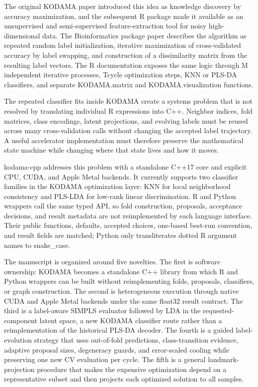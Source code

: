 \documentclass[twoside,11pt]{article}
\begin{document}
The original KODAMA paper introduced this idea as knowledge discovery by accuracy maximization, and the subsequent R package made it available as an unsupervised and semi-supervised feature-extraction tool for noisy high-dimensional data. The Bioinformatics package paper describes the algorithm as repeated random label initialization, iterative maximization of cross-validated accuracy by label swapping, and construction of a dissimilarity matrix from the resulting label vectors. The R documentation exposes the same logic through M independent iterative processes, Tcycle optimization steps, KNN or PLS-DA classifiers, and separate KODAMA.matrix and KODAMA.visualization functions.

The repeated classifier fits inside KODAMA create a systems problem that is not resolved by translating individual R expressions into C++. Neighbor indices, fold matrices, class encodings, latent projections, and evolving labels must be reused across many cross-validation calls without changing the accepted label trajectory. A useful accelerator implementation must therefore preserve the mathematical state machine while changing where that state lives and how it moves.

kodama-cpp addresses this problem with a standalone C++17 core and explicit CPU, CUDA, and Apple Metal backends. It currently supports two classifier families in the KODAMA optimization layer: KNN for local neighborhood consistency and PLS-LDA for low-rank linear discrimination. R and Python wrappers call the same typed API, so fold construction, proposals, acceptance decisions, and result metadata are not reimplemented by each language interface. Their public functions, defaults, accepted choices, one-based best-run convention, and result fields are matched; Python only transliterates dotted R argument names to snake\_case.

The manuscript is organized around five novelties. The first is software ownership: KODAMA becomes a standalone C++ library from which R and Python wrappers can be built without reimplementing folds, proposals, classifiers, or graph construction. The second is heterogeneous execution through native CUDA and Apple Metal backends under the same float32 result contract. The third is a label-aware SIMPLS evaluator followed by LDA in the requested-component latent space, a new KODAMA classifier route rather than a reimplementation of the historical PLS-DA decoder. The fourth is a guided label-evolution strategy that uses out-of-fold predictions, class-transition evidence, adaptive proposal sizes, degeneracy guards, and error-scaled cooling while preserving one new CV evaluation per cycle. The fifth is a general landmark-projection procedure that makes the expensive optimization depend on a representative subset and then projects each optimized solution to all samples.
\end{document}
